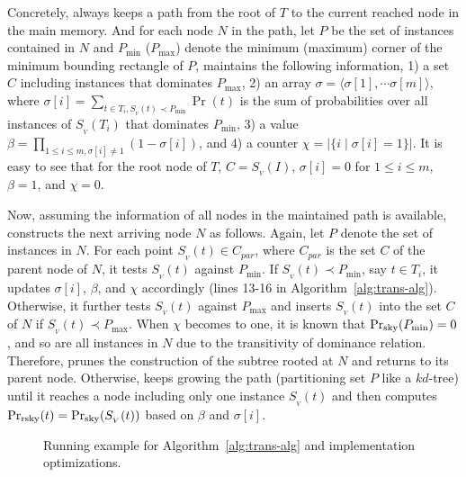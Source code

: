 Concretely, \skyprob always keeps a path from the root of $T$ to the current reached node in the main memory.
And for each node $N$ in the path, let $P$ be the set of instances contained in $N$ and $P_{\min}$ ($P_{\max}$) denote the minimum (maximum) corner of the minimum bounding rectangle of $P$, \skyprob maintains the following information,
1) a set $C$ including instances that dominates $P_{\max}$,
2) an array $\sigma = \langle \sigma[1], \cdots \sigma[m] \rangle$, where $\sigma[i] = \sum_{t \in T_i, S_{_V}(t) \prec P_{\min}} \Pr(t)$ is the sum of probabilities over all instances of $S_{_V}(T_i)$ that dominates $P_{\min}$,
3) a value $\beta = \prod_{1 \le i \le m, \sigma[i] \ne 1}(1 - \sigma[i])$,
and 4) a counter $\chi = |\{i \mid \sigma[i] = 1\}|$.
It is easy to see that for the root node of $T$, $C = S_{_V}(I)$, $\sigma[i] = 0$ for $1 \le i \le m$, $\beta = 1$, and $\chi = 0$.

Now, assuming the information of all nodes in the maintained path is available, \skyprob constructs the next arriving node $N$ as follows.
Again, let $P$ denote the set of instances in $N$.
For each point $S_{_V}(t) \in C_{par}$, where $C_{par}$ is the set $C$ of the parent node of $N$, it tests $S_{_V}(t)$ against $P_{\min}$.
If $S_{_V}(t) \prec P_{\min}$, say $t \in T_i$, it updates $\sigma[i]$, $\beta$, and $\chi$ accordingly (lines 13-16 in Algorithm~\ref{alg:trans-alg}).
Otherwise, it further tests $S_{_V}(t)$ against $P_{\max}$ and inserts $S_{_V}(t)$ into the set $C$ of $N$ if $S_{_V}(t) \prec P_{\max}$.
When $\chi$ becomes to one, it is known that $\Pr_{\rm sky}(P_{\min}) = 0$, and so are all instances in $N$ due to the transitivity of dominance relation.
Therefore, \skyprob prunes the construction of the subtree rooted at $N$ and returns to its parent node.
Otherwise, \skyprob keeps growing the path (partitioning set $P$ like a $kd$-tree) until it reaches a node including only one instance $S_{_V}(t)$ and then computes $\Pr_{\rm rsky}(t) = \Pr_{\rm sky}(S_{_V}(t))$ based on $\beta$ and $\sigma[i]$.

\begin{figure}[t]
    \hfill
	\caption{Running example for Algorithm~\ref{alg:trans-alg} and implementation optimizations.}
	\label{fig:alg-trans}
\end{figure}

